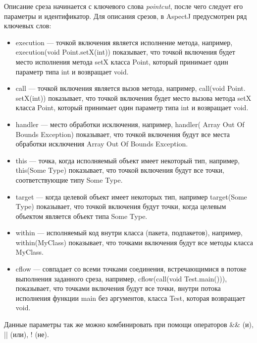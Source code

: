 Описание среза начинается с ключевого слова \textit{pointcut}, после чего
следует его параметры и идентификатор.
Для описания срезов, в AspectJ предусмотрен ряд ключевых слов:
  \begin{itemize}
    \item execution --- точкой включения является исполнение метода, 
      например, execution(void Point.setX(int)) показывает, что точкой 
      включения будет место исполнения метода setX класса Point, который 
      принимает один параметр типа int и возвращает void.
    \item call --- точкой включения является вызов метода, например, 
      call(void Point. setX(int)) показывает, что точкой 
      включения будет место вызова метода setX класса Point, который 
      принимает один параметр типа int и возвращает void.
    \item handler --- место обработки исключения, например, 
      handler( Array Out Of Bounds Exception) показывает, что точкой 
      включения будут все места обработки исключения Array Out Of Bounds 
      Exception.
    \item this --- точка, когда исполняемый объект имеет некоторый тип, 
      например, this(Some Type) показывает, что точкой включения будут все 
      точки, соответствующие типу Some Type.
    \item target --- когда целевой объект имеет некоторых тип, например 
      target(Some Type) показывает, что точкой включения будут точки, когда 
      целевым объектом является объект типа Some Type.
    \item within --- исполняемый код внутри класса (пакета, подпакетов), 
      например, within(MyClass) показывает, что точками включения будут все 
      методы класса MyClass.
    \item cflow --- совпадает со всеми точками соединения, встречающимися в 
      потоке выполнения заданного среза, например, cflow(call(void 
      Test.main())), показывает, что точками включения будут все точки, 
      внутри потока исполнения функции main без аргументов, класса Test, 
      которая возвращает void.
  \end{itemize}
Данные параметры так же можно комбинировать при помощи операторов \&\& (и), 
|| (или), ! (не).
  
